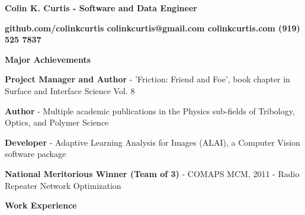 \documentclass[letterpaper,final]{memoir}
\newcommand{\LargeSep}{\vspace{1.3em}}
\newcommand{\Sep}{\vspace{1.0em}}
\newcommand{\SmallSep}{\vspace{0.4em}}
\newcommand{\CVSection}[1]
	{\LARGE\textbf{#1}\par
	\SmallSep\normalsize}
\newcommand{\CVItem}[1]
	{\textbf{\color{Blue} #1}}
\newcommand\tab[1][1cm]{\hspace*{#1}}
\begin{document}
\Huge \bfseries {\color{Blue} Colin K. Curtis - Software and Data Engineer}

\SmallSep
\normalsize\normalfont

\CVItem  \tab \bfseries {github.com/colinkcurtis \tab colinkcurtis@gmail.com  \tab colinkcurtis.com \tab  (919) 525 7837} 

\Sep





\notoserif \CVSection{Major Achievements}
\normalfont

\Sep

\begin{compactitem}
    
    \item \textbf{Project Manager and Author} - 'Friction: Friend and Foe', book chapter in Surface and Interface Science Vol. 8
    \SmallSep

    \item \textbf{Author} - Multiple academic publications in the Physics sub-fields of Tribology, Optics, and Polymer Science
    \SmallSep

    \item \textbf{Developer} - Adaptive Learning Analysis for Images (ALAI), a Computer Vision software package
    \SmallSep
    
    \item \textbf{National Meritorious Winner (Team of 3)} - COMAPS MCM, 2011 - Radio Repeater Network Optimization
	
\end{compactitem}

\LargeSep


\notoserif \CVSection{Work Experience}
\normalfont

\Sep
\end{document}
